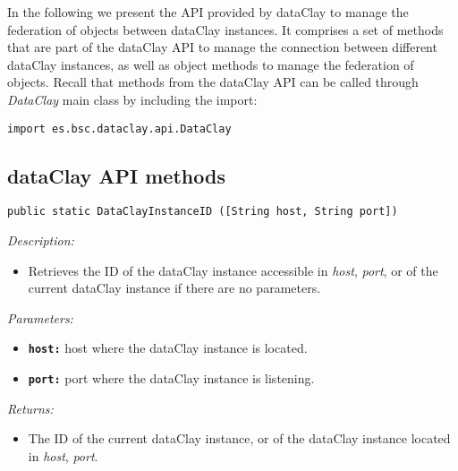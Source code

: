 In the following we present the API provided by dataClay to manage the federation of objects between dataClay instances. It comprises a set of methods that are part of the dataClay API to manage the connection between different dataClay instances, as well as object methods to manage the federation of objects. Recall that methods from the dataClay API can be called through \textit{DataClay} main class by including the import:

\colorbox{basecolor!20}{\texttt{import es.bsc.dataclay.api.DataClay}}

\subsection{dataClay API methods}
\label{sec:JavaFederationAPI}


\begin{dBox}
\texttt{public static DataClayInstanceID ([String host, String port])}
\LINE

{\it Description:}

\begin{itemize}
    \item Retrieves the ID of the dataClay instance accessible in \textit{host}, \textit{port}, or of the current dataClay instance if there are no parameters.
\end{itemize}

{\it Parameters:}

\begin{itemize}
  \item \texttt{\bfseries host:} host where the dataClay instance is located.
  \item \texttt{\bfseries port:} port where the dataClay instance is listening.
\end{itemize}

{\it Returns:}

\begin{itemize}
 \item The ID of the current dataClay instance, or of the dataClay instance located in \textit{host}, \textit{port}.
\end{itemize}

\end{dBox}


